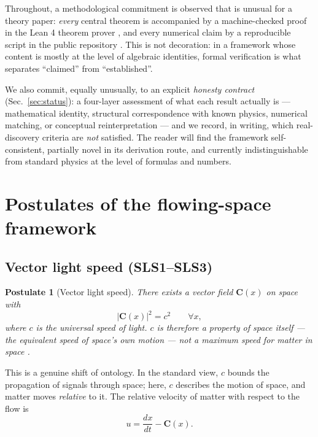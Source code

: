 \documentclass[aps,prd,preprint,superscriptaddress,amsmath,amssymb]{revtex4-2}
\newtheorem{postulate}{Postulate}[section]
\begin{document}
Throughout, a methodological commitment is observed that is unusual for a
theory paper: \emph{every} central theorem is accompanied by a machine-checked
proof in the Lean 4 theorem prover \cite{deMoura2015,mathlib2020}, and every
numerical claim by a reproducible script in the public repository
\cite{ProjectionPhysics}.  This is not decoration: in a framework whose
content is mostly at the level of algebraic identities, formal verification
is what separates ``claimed'' from ``established''.

We also commit, equally unusually, to an explicit \emph{honesty contract}
(Sec.~\ref{sec:status}): a four-layer assessment of what each result
actually is --- mathematical identity, structural correspondence with known
physics, numerical matching, or conceptual reinterpretation --- and we
record, in writing, which real-discovery criteria are \emph{not} satisfied.
The reader will find the framework self-consistent, partially novel in its
derivation route, and currently indistinguishable from standard physics at
the level of formulas and numbers.

\section{Postulates of the flowing-space framework}\label{sec:postulates}

\subsection{Vector light speed (SLS1--SLS3)}

\begin{postulate}[Vector light speed]
\label{post:sls1}
There exists a vector field $\bm{C}(x)$ on space with
\begin{equation}
|\bm{C}(x)|^2 = c^2 \qquad \forall x,
\end{equation}
where $c$ is the universal speed of light.  $c$ is therefore a property of
\emph{space itself} --- the equivalent speed of space's own motion --- not a
maximum speed for matter \emph{in} space \cite{ProjectionPhysics-SLS}.
\end{postulate}

This is a genuine shift of ontology.  In the standard view, $c$ bounds the
propagation of signals through space; here, $c$ describes the motion of
space, and matter moves \emph{relative} to it.  The relative velocity of
matter with respect to the flow is
\begin{equation}
u = \frac{dx}{dt} - \bm{C}(x).
\end{equation}
\end{document}
